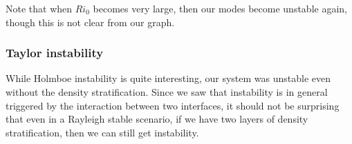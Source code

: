 \documentclass[a4paper]{article}
\begin{document}
Note that when $Ri_0$ becomes very large, then our modes become unstable again, though this is not clear from our graph.

%
%
%
%
%
%
%
\subsubsection*{Taylor instability}
While Holmboe instability is quite interesting, our system was unstable even without the density stratification. Since we saw that instability is in general triggered by the interaction between two interfaces, it should not be surprising that even in a Rayleigh stable scenario, if we have two layers of density stratification, then we can still get instability.
\end{document}
